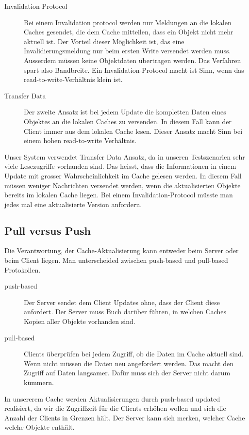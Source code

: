 \begin{description}
\item[Invalidation-Protocol] Bei einem Invalidation protocol werden nur Meldungen an die lokalen Caches gesendet, die dem Cache mitteilen, dass ein Objekt nicht mehr aktuell ist. Der Vorteil dieser Möglichkeit ist, das eine Invalidierungsmeldung nur beim ersten Write versendet werden muss. Ausserdem müssen keine Objektdaten übertragen werden. Das Verfahren spart also Bandbreite. Ein Invalidation-Protocol macht ist Sinn, wenn das read-to-write-Verhältnis klein ist.
\item[Transfer Data] Der zweite Ansatz ist bei jedem Update die kompletten Daten eines Objektes an die lokalen Caches zu versenden. In diesem Fall kann der Client immer aus dem lokalen Cache lesen. Dieser Ansatz macht Sinn bei einem hohen read-to-write Verhältnis.
\end{description}

Unser System verwendet Transfer Data Ansatz, da in unseren Testszenarien sehr viele Lesezugriffe vorhanden sind. Das heisst, dass die Informationen in einem Update mit grosser Wahrscheinlichkeit im Cache gelesen werden. In diesem Fall müssen weniger Nachrichten versendet werden, wenn die aktualisierten Objekte bereits im lokalen Cache liegen. Bei einem Invalidation-Protocol müsste man jedes mal eine aktualisierte Version anfordern.

\subsection{Pull versus Push}
\label{sec:pull-versus-push}

Die Verantwortung, der Cache-Aktualisierung kann entweder beim Server oder beim Client liegen. Man unterscheided zwischen push-based und pull-based Protokollen.

\begin{description}
\item[push-based] Der Server sendet dem Client Updates ohne, dass der Client diese anfordert. Der Server muss Buch darüber führen, in welchen Caches Kopien aller Objekte vorhanden sind.
\item[pull-based] Clients überprüfen bei jedem Zugriff, ob die Daten im Cache aktuell sind. Wenn nicht müssen die Daten neu angefordert werden. Das macht den Zugriff auf Daten langsamer. Dafür muss sich der Server nicht darum kümmern.
\end{description}

In unsererem Cache werden Aktualisierungen durch push-based updated realisiert, da wir die Zugriffzeit für die Clients erhöhen wollen und sich die Anzahl der Clients in Grenzen hält. Der Server kann sich merken, welcher Cache welche Objekte enthält.

